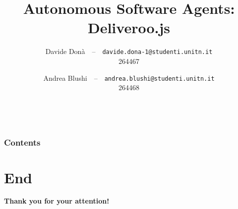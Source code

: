 \documentclass[10pt]{beamer}
\begin{document}
\title{Autonomous Software Agents: Deliveroo.js}
\author[University of Trento]{%
  Davide Donà\ \ --\ \ \small\texttt{davide.dona-1@studenti.unitn.it}\\
  \small 264467\\
  \and
  Andrea Blushi\ \ --\ \ \small\texttt{andrea.blushi@studenti.unitn.it}\\
  \small 264468
}


\date[]{\MonthName\ \number\year}

\frame{\titlepage}
\begin{frame}
\frametitle{Contents}
\tableofcontents
\end{frame}






\section*{End}  
\begin{frame}
\begin{center}
    {\Large\textbf{Thank you for your attention!}} \\
\end{center}
\end{frame}
\end{document}
